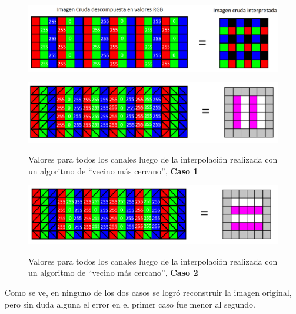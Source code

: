 \documentclass[a4paper]{article}
\begin{document}
\begin{figure}[h!]
    \caption{}
    \begin{center}
    \includegraphics[scale=0.45]{imagenes/apxlvecino1}
    \label{apxlvecino1}
  \end{center}
\end{figure}


\begin{figure}[h!]
    \caption{Valores para todos los canales luego de la interpolación realizada con un algoritmo de ``vecino más cercano'', \textbf{Caso 1}}
    \begin{center}
    \includegraphics[scale=0.45]{imagenes/apxlvecino2}
    \label{apxlvecino2}
  \end{center}
\end{figure}

\begin{figure}[h!]
    \caption{ Valores para todos los canales luego de la interpolación realizada con un algoritmo de ``vecino más cercano'', \textbf{Caso 2}}
    \begin{center}
    \includegraphics[scale=0.45]{imagenes/apxlvecinoOTRO2}
    \label{apxlvecinoOTRO2}
  \end{center}
\end{figure}

\newpage

Como se ve, en ninguno de los dos casos se logró reconstruir la imagen original, pero sin duda alguna el error en el primer caso fue menor al segundo.\\
\end{document}
